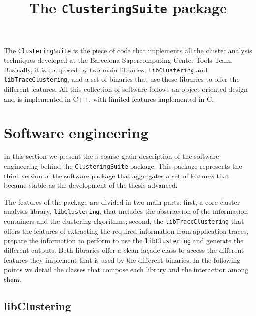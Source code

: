 \documentclass[a4paper, 12pt]{article}
\begin{document}
\graphicspath{{figures/}}

\title{The \texttt{ClusteringSuite} package}

\maketitle

The \texttt{ClusteringSuite} is the piece of code that implements all
the cluster analysis techniques developed at the Barcelona Supercomputing Center
Tools Team. Basically, it is composed by two main libraries,
\texttt{libClustering} and \texttt{libTrace\-Clustering}, and a set of binaries
that use these libraries to offer the different features. All this collection of 
software follows an object-oriented design and is implemented in C++, with
limited features implemented in C.

\section{Software engineering}


In this section we present the a coarse-grain description of the software
engineering behind the \texttt{ClusteringSuite} package. This package 
represents the third version of the software package that aggregates a set of
features that became stable as the development of the thesis advanced.

The features of the package are divided in two main parts: first, a core 
cluster analysis library, \texttt{libClustering}, that includes the 
abstraction of the information containers and the clustering algorithms; 
second, the \texttt{libTrace\-Clustering} that offers the features of extracting
the required information from application traces, prepare the information to 
perform to use the \texttt{libClustering} and generate the different outputs.
Both libraries offer a clean façade class to access the different features
they implement that is used by the different binaries. In the following 
points we detail the classes that compose each library and the interaction 
among them.

\subsection{libClustering}
\end{document}
